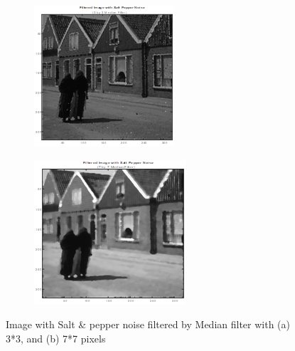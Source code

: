 \begin{figure}
\begin{subfigure}{0.4\textwidth}
        \caption{}
        \label{fig:Second}
    \end{subfigure}
    \vfill
    \begin{subfigure}{0.4\textwidth}
        \includegraphics[width=\textwidth]{Resources/F9-a.png}
        \caption{}
        \label{fig:first}
    \end{subfigure}
    \hfill
    \begin{subfigure}{0.4\textwidth}
        \includegraphics[width=\textwidth]{Resources/F9-b.png}
        \caption{}
        \label{fig:Second}
    \end{subfigure}
    \caption{Image with Salt \& pepper noise filtered by Median filter with (a) 3*3, and (b) 7*7 pixels}
    \label{fig:ApplyingFilters}
\end{figure}

